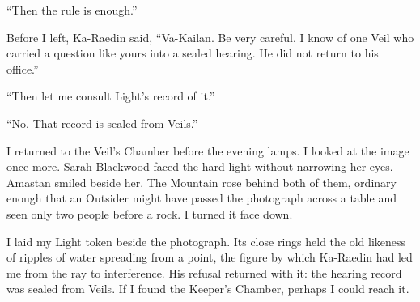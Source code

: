 ``Then the rule is enough.''\par

Before I left, Ka-Raedin said, ``Va-Kailan. Be very careful. I know of one Veil who carried a question like yours into a sealed hearing. He did not return to his office.''\par

``Then let me consult Light's record of it.''\par

``No. That record is sealed from Veils.''\par

I returned to the Veil's Chamber before the evening lamps. I looked at the image once more. Sarah Blackwood faced the hard light without narrowing her eyes. Amastan smiled beside her. The Mountain rose behind both of them, ordinary enough that an Outsider might have passed the photograph across a table and seen only two people before a rock. I turned it face down.\par

I laid my Light token beside the photograph. Its close rings held the old likeness of ripples of water spreading from a point, the figure by which Ka-Raedin had led me from the ray to interference. His refusal returned with it: the hearing record was sealed from Veils. If I found the Keeper's Chamber, perhaps I could reach it.\par

